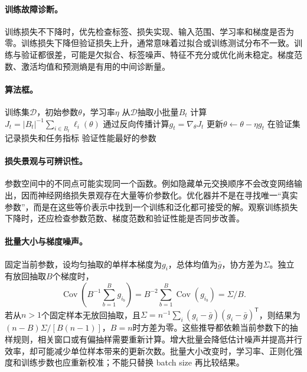\paragraph{训练故障诊断。}
训练损失不下降时，优先检查标签、损失实现、输入范围、学习率和梯度是否为零。训练损失下降但验证损失上升，通常意味着过拟合或训练测试分布不一致。训练与验证都很差，可能是欠拟合、标签噪声、特征不充分或优化尚未稳定。梯度范数、激活均值和预测熵是有用的中间诊断量。

\paragraph{算法框。}
\begin{algorithm}
\caption{小批量梯度训练的基本流程}
\begin{algorithmic}[1]
\Require 训练集$\mathcal{D}$，初始参数$\theta$，学习率$\eta$
  \State 从$\mathcal{D}$抽取小批量$B_t$
  \State 计算$J_t=|B_t|^{-1}\sum_{i\in B_t}\ell_i(\theta)$
  \State 通过反向传播计算$g_t=\nabla_\theta J_t$
  \State 更新$\theta\leftarrow\theta-\eta g_t$
  \State 在验证集记录损失和任务指标
\EndFor
\State \Return 验证性能最好的参数
\end{algorithmic}
\end{algorithm}

\paragraph{损失景观与可辨识性。}
参数空间中的不同点可能实现同一个函数。例如隐藏单元交换顺序不会改变网络输出，因而神经网络损失景观存在大量等价参数化。优化器并不是在寻找唯一“真实参数”，而是在这些等价表示中找到一个训练和泛化都可接受的解。观察训练损失下降时，还应检查参数范数、梯度范数和验证性能是否同步改善。

\paragraph{批量大小与梯度噪声。}
固定当前参数，设均匀抽取的单样本梯度为$g_i$，总体均值为$\bar g$，协方差为$\Sigma$。独立有放回抽取$B$个梯度时，
\begin{equation}
 \operatorname{Cov}\left(B^{-1}\sum_{b=1}^Bg_{i_b}\right)
 =B^{-2}\sum_{b=1}^B\operatorname{Cov}(g_{i_b})=\Sigma/B.
\end{equation}
若从$n>1$个固定样本无放回抽取，且$\Sigma=n^{-1}\sum_i(g_i-\bar g)(g_i-\bar g)^{\mathsf T}$，则结果为$(n-B)\Sigma/[B(n-1)]$，$B=n$时方差为零。这些推导都依赖当前参数下的抽样规则，相关窗口或有偏抽样需要重新计算。增大批量会降低估计噪声并提高并行效率，却可能减少单位样本带来的更新次数。批量大小改变时，学习率、正则化强度和训练步数也应重新校准；不能只替换 batch size 再比较结果。

